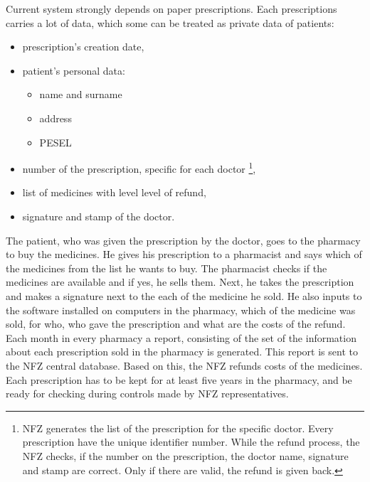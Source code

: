 Current system strongly depends on paper prescriptions. Each prescriptions carries a lot of data, which some can be treated as private data of patients:
\\
\begin{itemize}
	\item prescription's creation date,\\
	\item patient's personal data:\\
	\begin{itemize}
		\item name and surname
		\item address
		\item PESEL\\
	\end{itemize}
	\item number of the prescription, specific for each doctor \footnote{NFZ generates the list of the prescription for the specific doctor. Every prescription have the unique
	identifier number. While the refund process, the NFZ checks, if the number on the prescription, the
	doctor name, signature and stamp are correct. Only if there are valid, the refund is given back.},\\
	\item list of medicines with level level of refund,\\
	\item signature and stamp of the doctor.\\
\end{itemize}

The patient, who was given the prescription by the doctor, goes to the pharmacy to buy the medicines. He gives his prescription to a pharmacist and says which of the medicines from the list he wants to buy. The pharmacist checks if the medicines are available and if yes, he sells them. Next, he takes the prescription and makes a signature next to the each of the medicine he sold. He also inputs to the software installed on
computers in the pharmacy, which of the medicine was sold, for who, who gave the prescription and what are the costs of the refund.\\

Each month in every pharmacy a report, consisting of the set of the information about each prescription sold in the pharmacy is generated. This report is sent to the NFZ central database. Based on this, the NFZ refunds costs of the medicines. Each prescription has to be kept for at least five years in the pharmacy, and be ready for checking during controls made by NFZ representatives.
\clearpage


